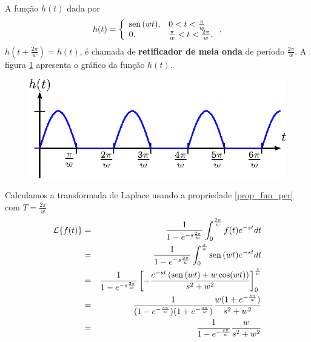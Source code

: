 \begin{ex} A função $h(t)$ dada por
\begin{equation}
h(t)=\left\{\begin{array}{ll}\operatorname{sen}\,(wt),&0<t<\frac{\pi}{w}\\0,& \frac{\pi}{w}<t<\frac{2\pi}{w}, \end{array}\right.,
\end{equation}
$h\left(t+\frac{2\pi}{w}\right)=h(t)$, é chamada de {\bf retificador de meia onda} de período $\frac{2\pi}{w}$. A figura \ref{fig_ret_meia_onda} apresenta o gráfico da função $h(t)$.
 \begin{figure}[!ht]
\begin{center}

\includegraphics{cap_especiais_coef_var/pics/figura_3}\end{center}
\caption{\label{fig_ret_meia_onda}}
\end{figure}
Calculamos a transformada de Laplace usando a propriedade \ref{prop_fun_per} com $T=\frac{2\pi}{w}$
\begin{eqnarray*}
\mathcal{L}\{f(t)\}&=& \frac{1}{1-e^{-s\frac{2\pi}{w}}}\int_0^{\frac{2\pi}{w}}f(t)e^{-st}dt\\
&=& \frac{1}{1-e^{-s\frac{2\pi}{w}}} \int_0^{\frac{\pi}{w}}\operatorname{sen}\,(wt)e^{-st}dt\\
&=& \frac{1}{1-e^{-s\frac{2\pi}{w}}} \left[-\frac{e^{-st}\left(\operatorname{sen}\,(wt)+w\cos(wt)\right)}{s^2+w^2}\right]_0^{\frac{\pi}{w}}\\
&=& \frac{1}{(1-e^{-\frac{s\pi}{w}})(1+e^{-\frac{s\pi}{w}})} \frac{w(1+e^{-\frac{s\pi}{w}})}{s^2+w^2}\\
&=& \frac{1}{1-e^{-\frac{s\pi}{w}}} \frac{w}{s^2+w^2}
\end{eqnarray*}
\end{ex}
